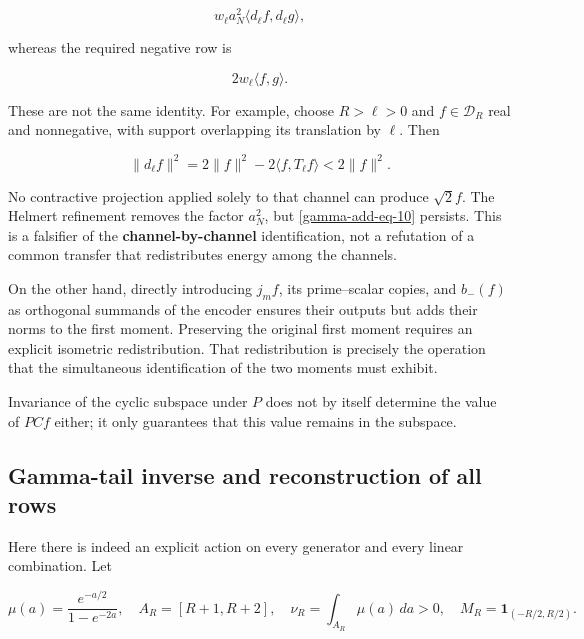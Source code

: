 \begin{equation}
w_\ell a_N^2\langle d_\ell f,d_\ell g\rangle,
\label{gamma-add-display-22}
\end{equation}

whereas the required negative row is

\begin{equation}
2w_\ell\langle f,g\rangle.
\label{gamma-add-display-23}
\end{equation}

These are not the same identity. For example, choose \(R>\ell>0\) and \(f\in\mathcal D_R\) real and nonnegative, with support overlapping its translation by \(\ell\). Then

\begin{equation}
\|d_\ell f\|^2
=2\|f\|^2-2\langle f,T_\ell f\rangle
<2\|f\|^2.
\label{gamma-add-eq-10}
\end{equation}

No contractive projection applied solely to that channel can produce \(\sqrt2f\). The Helmert refinement removes the factor \(a_N^2\), but \eqref{gamma-add-eq-10} persists. This is a falsifier of the \textbf{channel-by-channel} identification, not a refutation of a common transfer that redistributes energy among the channels.

On the other hand, directly introducing \(j_mf\), its prime--scalar copies, and \(b_-(f)\) as orthogonal summands of the encoder ensures their outputs but adds their norms to the first moment. Preserving the original first moment requires an explicit isometric redistribution. That redistribution is precisely the operation that the simultaneous identification of the two moments must exhibit.

Invariance of the cyclic subspace under \(P\) does not by itself determine the value of \(PCf\) either; it only guarantees that this value remains in the subspace.

\subsection{Gamma-tail inverse and reconstruction of all rows}
\label{gamma-add-sub-288}

Here there is indeed an explicit action on every generator and every linear combination. Let

\begin{equation}
\mu(a)=\frac{e^{-a/2}}{1-e^{-2a}},\quad
A_R=[R+1,R+2],\quad \nu_R=\int_{A_R}\mu(a)\,da>0,
\quad M_R=\mathbf1_{(-R/2,R/2)}.
\label{gamma-add-display-25}
\end{equation}


